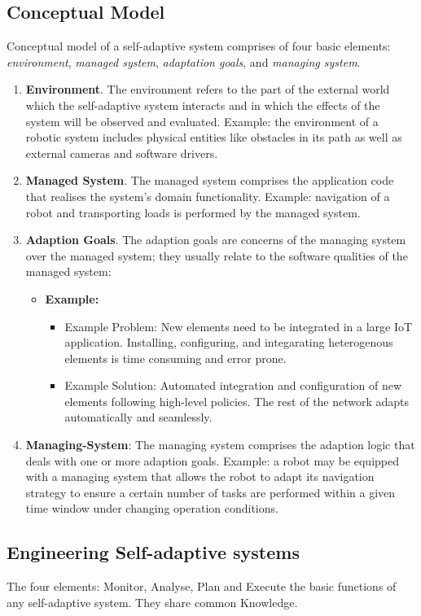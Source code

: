 \documentclass[pdftex,english,oribibl]{llncs}
\begin{document}
\subsection{Conceptual Model} Conceptual model of a self-adaptive system comprises of four basic elements: \emph{environment}, \emph{managed system}, \emph{adaptation goals}, and \emph{managing system}.
\begin{enumerate}
\item \textbf{Environment}. The environment refers to the part of the external world
which the self-adaptive system interacts and in which the effects of
the system will be observed and evaluated. Example: the environment of
a robotic system includes physical entities like obstacles in its path
as well as external cameras and software drivers.
\item \textbf{Managed System}. The managed system comprises the application code that
realises the system's domain functionality. Example: navigation of a
robot and transporting loads is performed by the managed system.
\item \textbf{Adaption Goals}. The adaption goals are concerns of the managing system
over the managed system; they usually relate to the software qualities
of the managed system:
\begin{itemize}
\item \textbf{Example:}
\begin{itemize}
\item Example Problem: New elements need to be integrated in a large
IoT application. Installing, configuring, and integarating
heterogenous elements is time consuming and error prone.
\item Example Solution: Automated integration and configuration of new
elements following high-level policies. The rest of the network
adapts automatically and seamlessly.
\end{itemize}
\end{itemize}
\item \textbf{Managing-System}: The managing system comprises the adaption logic that deals with one or
more adaption goals. Example: a robot may be equipped with a managing
system that allows the robot to adapt its navigation strategy to
ensure a certain number of tasks are performed within a given time
window under changing operation conditions.
\end{enumerate}

\pagebreak
\subsection{Engineering Self-adaptive systems}
        The four elements: Monitor, Analyse, Plan and Execute the basic
		functions of any self-adaptive system. They share common Knowledge.
\end{document}
